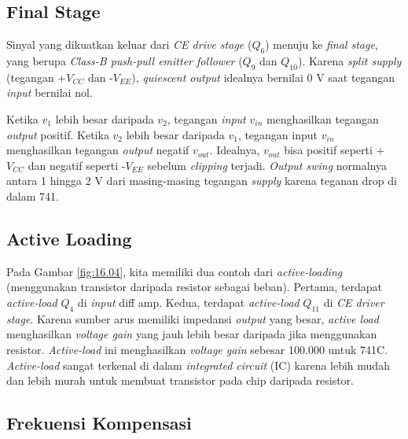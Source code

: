 \subsection{Final Stage}

Sinyal yang dikuatkan keluar dari \textit{CE drive stage} ($ Q_6 $) menuju ke \textit{final stage}, yang berupa \textit{Class-B push-pull emitter follower} ($ Q_9 $ dan $ Q_{10} $). Karena \textit{split supply} (tegangan +$ V_{CC} $ dan -$ V_{EE} $), \textit{quiescent output} idealnya bernilai 0 V saat tegangan \textit{input} bernilai nol.

Ketika $ v_1 $ lebih besar daripada $ v_2 $, tegangan \textit{input} $ v_{in} $ menghasilkan tegangan \textit{output} positif. Ketika $ v_2 $ lebih besar daripada $ v_1 $, tegangan input $ v_{in} $ menghasilkan tegangan \textit{output} negatif $ v_{out} $. Idealnya, $ v_{out} $ bisa positif seperti +$ V_{CC} $ dan negatif seperti -$ V_{EE} $ sebelum \textit{clipping} terjadi. \textit{Output swing} normalnya antara 1 hingga 2 V dari masing-masing tegangan \textit{supply} karena teganan drop di dalam 741.


\subsection{Active Loading}

Pada Gambar \ref{fig:16.04}, kita memiliki dua contoh dari \textit{active-loading} (menggunakan transistor daripada resistor sebagai beban). Pertama, terdapat \textit{active-load} $ Q_4 $ di \textit{input} diff amp. Kedua, terdapat \textit{active-load} $ Q_{11} $ di \textit{CE driver stage}. Karena sumber arus memiliki impedansi \textit{output} yang besar, \textit{active load} menghasilkan \textit{voltage gain} yang jauh lebih besar daripada jika menggunakan resistor. \textit{Active-load} ini menghasilkan \textit{voltage gain} sebesar 100.000 untuk 741C. \textit{Active-load} sangat terkenal di dalam \textit{integrated circuit} (IC) karena lebih mudah dan lebih murah untuk membuat transistor pada chip daripada resistor.


\subsection{Frekuensi Kompensasi}

